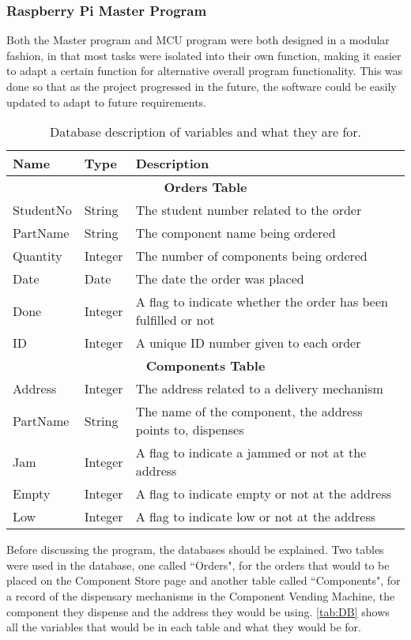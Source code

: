 \documentclass[a4paper,11pt]{article}
\numberwithin{figure}{section}
\numberwithin{table}{section}
\begin{document}
\subsubsection{Raspberry Pi Master Program}

Both the Master program and MCU program were both designed in a modular fashion, in that most tasks were isolated into their own function, making it easier to adapt a certain function for alternative overall program functionality. This was done so that as the project progressed in the future, the software could be easily updated to adapt to future requirements.

	\begin{center}
		\begin{table}[ht]
			\centering
			\begin{tabular}{| m{2cm} | m{2cm}| m{10cm} |}
			\hline 
			Name & Type & Description\\
			\hline
			\multicolumn{3}{|c|}{\bfseries Orders Table}\\
			\hline	
			StudentNo & String & The student number related to the order \\
			\hline
			PartName & String & The component name being ordered \\
			\hline
			Quantity & Integer & The number of components being ordered \\
			\hline			
			Date & Date & The date the order was placed \\
			\hline
			Done & Integer & A flag to indicate whether the order has been fulfilled or not\\
			\hline
			ID & Integer & A unique ID number given to each order\\
			\hline
			\multicolumn{3}{|c|}{\bfseries Components Table}\\
			\hline
			Address & Integer & The address related to a delivery mechanism \\
			\hline
			PartName & String & The name of the component, the address points to, dispenses \\
			\hline
			Jam & Integer & A flag to indicate a jammed or not at the address\\
			\hline
			Empty & Integer & A flag to indicate empty or not at the address\\
			\hline
			Low & Integer & A flag to indicate low or not at the address\\
			\hline
			\end{tabular}
		\caption{Database description of variables and what they are for. \label{tab:DB}}
		\end{table}
	\end{center}
Before discussing the program, the databases should be explained. Two tables were used in the database, one called ``Orders", for the orders that would to be placed on the Component Store page and another table called ``Components", for a record of the dispensary mechanisms in the Component Vending Machine, the component they dispense and the address they would be using. \autoref{tab:DB} shows all the variables that would be in each table and what they would be for.
\end{document}
